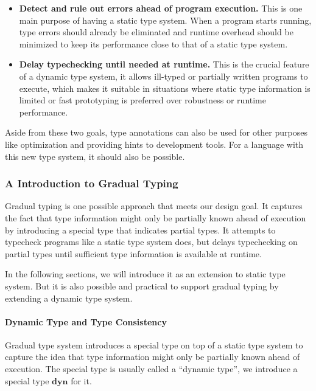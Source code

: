 \begin{itemize}
	\item \textbf{Detect and rule out errors ahead of program execution.}
	This is one main purpose of having a static type system. When a program starts running,
	type errors should already be eliminated and runtime overhead should be minimized
	to keep its performance close to that of a static type system.
	\item \textbf{Delay typechecking until needed at runtime.}
	This is the crucial feature of a dynamic type system,
	it allows ill-typed or partially written programs to execute,
	which makes it suitable in situations where static type information
	is limited or fast prototyping is preferred over robustness or runtime performance.
\end{itemize}

Aside from these two goals, type annotations can also be used for
other purposes like optimization and providing hints to development tools.
For a language with this new type system, it should also be possible.

\subsubsection{A Introduction to Gradual Typing}

\newcommand{\dyn}{\textbf{dyn}}

Gradual typing is one possible approach that meets our design goal.
It captures the fact that type information might only be partially known
ahead of execution by introducing a special type that indicates partial types.
It attempts to typecheck programs like a static type system does, but delays
typechecking on partial types until sufficient type information is available
at runtime.

In the following sections, we will introduce it
as an extension to static type system.
But it is also possible and practical to support gradual typing by
extending a dynamic type system.


\paragraph{Dynamic Type and Type Consistency}

Gradual type system introduces a special type on top of a static type system
to capture the idea that type information might only be partially known
ahead of execution.
The special type is usually called a ``dynamic type'', we introduce a special type $\dyn$ for it.

